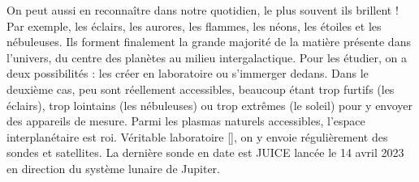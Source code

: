 On peut aussi en reconnaître dans notre quotidien, le plus souvent ils brillent ! Par exemple, les éclairs, les aurores, les flammes, les néons, les étoiles et les nébuleuses. Ils forment finalement la grande majorité de la matière présente dans l'univers, du centre des planètes au milieu intergalactique. Pour les étudier, on a deux possibilités : les créer en laboratoire ou s'immerger dedans. Dans le deuxième cas, peu sont réellement accessibles, beaucoup étant trop furtifs (les éclairs), trop lointains (les nébuleuses) ou trop extrêmes (le soleil) pour y envoyer des appareils de mesure. Parmi les plasmas naturels accessibles, l'espace interplanétaire est roi. Véritable laboratoire [\cite{bruno_solar_2005}], on y envoie régulièrement des sondes et satellites. La dernière sonde en date est \ac{JUICE} lancée le 14 avril 2023 en direction du système lunaire de Jupiter. 

